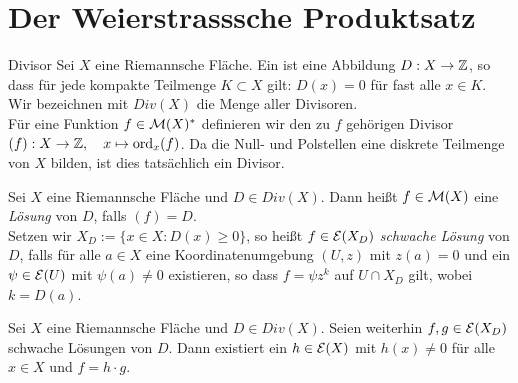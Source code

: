 
\section{Der Weierstrasssche Produktsatz}
\label{sec:Weierstrass}

\begin{defin}{Divisor}
  Sei $X$ eine Riemannsche Fläche. Ein  ist eine
  Abbildung $D: X \rightarrow \mathbb{Z}$, so dass für jede kompakte Teilmenge $K
  \subset X$ gilt: $D(x) = 0$ für fast alle $x \in K$. \\
  Wir bezeichnen mit $Div(X)$ die Menge aller Divisoren. \\
  Für eine Funktion $f \in \mathcal{M}(X)^\ast$ definieren wir den zu $f$
  gehörigen Divisor $(f): X \rightarrow \mathbb{Z}, \quad x \mapsto \operatorname{ord}_x(f)$. Da die
  Null- und Polstellen eine diskrete Teilmenge von $X$ bilden, ist
  dies tatsächlich ein Divisor.
\end{defin}

\begin{defin}
  \label{def:divisor-lsg}
  Sei $X$ eine Riemannsche Fläche und $D \in Div(X)$. Dann heißt $f
  \in \mathcal{M}(X)$ eine \emph{Lösung} von $D$, falls $(f) = D$. \\
  Setzen wir $X_D := \{x \in X: D(x) \geq 0 \}$, so heißt $f \in
  \mathcal{E}(X_D)$ \emph{schwache Lösung} von $D$, falls für alle $a \in X$
  eine Koordinatenumgebung $(U,z)$ mit $z(a) = 0$ und ein $\psi \in
  \mathcal{E}(U)$ mit $\psi(a) \neq 0$ existieren, so dass $f = \psi z^k$
  auf $ U \cap X_D$ gilt, wobei $k = D(a)$.
\end{defin}

\begin{lemma}
  Sei $X$ eine Riemannsche Fläche und $D \in Div(X)$. Seien weiterhin
  $f,g \in \mathcal{E}(X_D)$ schwache Lösungen von $D$. Dann existiert ein
  $h \in \mathcal{E}(X)$ mit $h(x) \neq 0$ für alle $x \in X$ und $ f
  = h\cdot g$.
\end{lemma}

